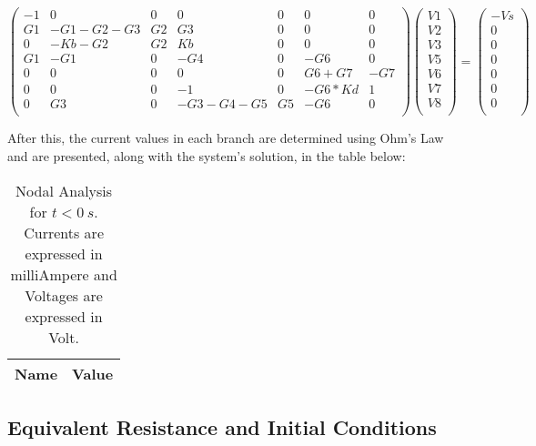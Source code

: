 \begin{equation}
\begin{pmatrix}
        -1 & 0 & 0 & 0 & 0 & 0 & 0\\
        G1 & -G1-G2-G3 & G2 & G3 & 0 & 0 & 0\\
        0 & -Kb-G2 & G2 & Kb & 0 & 0 & 0\\
        G1 & -G1 & 0 & -G4 & 0 & -G6 & 0\\
        0 & 0 & 0 & 0 & 0 & G6+G7 & -G7\\
        0 & 0 & 0 & -1 & 0 & -G6*Kd & 1\\
        0 & G3 & 0 & -G3-G4-G5 & G5 & -G6 & 0\\
\end{pmatrix}
\begin{pmatrix}
V1\\
V2\\
V3\\
V5\\
V6\\
V7\\
V8\\
\end{pmatrix}
=
\begin{pmatrix}
-Vs\\
0\\
0\\
0\\
0\\
0\\
0\\
\end{pmatrix}
\end{equation}

\newpage
After this, the current values in each branch are determined using Ohm's Law and are presented, along with the system's solution, in the table below:


\begin{table}[h]
  \centering
  \begin{tabular}{|l|r|}
    \hline
    {\bf Name} & {\bf Value} \\ \hline
    
  \end{tabular}
  \caption{Nodal Analysis for $t<0~s$. Currents are expressed in milliAmpere and Voltages are expressed in Volt.}                                                            
  \label{tab:theoretical1}                                                      
\end{table}   


\subsection{Equivalent Resistance and Initial Conditions}

